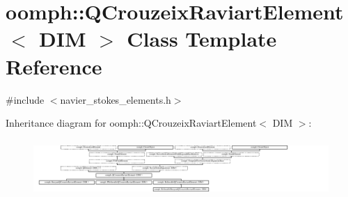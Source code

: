 \hypertarget{classoomph_1_1QCrouzeixRaviartElement}{}\section{oomph\+:\+:Q\+Crouzeix\+Raviart\+Element$<$ D\+IM $>$ Class Template Reference}
\label{classoomph_1_1QCrouzeixRaviartElement}


{\ttfamily \#include $<$navier\+\_\+stokes\+\_\+elements.\+h$>$}

Inheritance diagram for oomph\+:\+:Q\+Crouzeix\+Raviart\+Element$<$ D\+IM $>$\+:\begin{figure}[H]
\begin{center}
\leavevmode
\includegraphics[height=2.177778cm]{classoomph_1_1QCrouzeixRaviartElement}
\end{center}
\end{figure}
